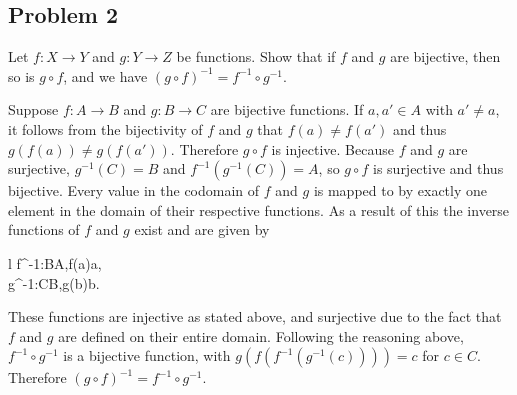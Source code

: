\documentclass{article}
\begin{document}
\subsection*{Problem 2}
Let \(f:X\rightarrow Y\) and \(g:Y\rightarrow Z\) be functions. Show that if \(f\) and \(g\) are bijective, then so is \(g\circ f\), and we have \((g\circ f)^{-1}=f^{-1}\circ g^{-1}\).
\medbreak
\begin{IEEEproof}
	Suppose \(f:A\rightarrow B\) and \(g:B\rightarrow C\) are bijective functions. If \(a,a'\in A\) with \(a'\neq a\), it follows from the bijectivity of \(f\) and \(g\) that \(f(a)\neq f(a')\) and thus \(g(f(a))\neq g(f(a'))\). Therefore \(g\circ f\) is injective. Because \(f\) and \(g\) are surjective, \(g^{-1}(C)=B\) and \(f^{-1}(g^{-1}(C))=A\), so \(g\circ f\) is surjective and thus bijective. Every value in the codomain of \(f\) and \(g\) is mapped to by exactly one element in the domain of their respective functions. As a result of this the inverse functions of \(f\) and \(g\) exist and are given by
	\begin{IEEEeqnarray*}{l}
		f^{-1}:B\rightarrow A,\quad f(a)\mapsto a,\\
		g^{-1}:C\rightarrow B,\quad g(b)\mapsto b.
	\end{IEEEeqnarray*}
	These functions are injective as stated above, and surjective due to the fact that \(f\) and \(g\) are defined on their entire domain. Following the reasoning above, \(f^{-1}\circ g^{-1}\) is a bijective function, with \(g(f(f^{-1}(g^{-1}(c))))=c\) for \(c\in C\). Therefore \((g\circ f)^{-1}=f^{-1}\circ g^{-1}\).
\end{IEEEproof}
\end{document}
